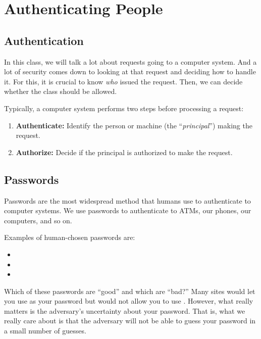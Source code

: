 \chapter{Authenticating People}


\section{Authentication}
In this class, we will talk a lot about requests
going to a computer system.
And a lot of security comes down to looking at that request and deciding
how to handle it.
For this, it is crucial to know
\textit{who} issued the request. Then, we can
decide whether the class should be allowed.

Typically, a computer system performs two steps before processing
a request:
\begin{enumerate}
  \item \textbf{Authenticate:} Identify the person or machine (the ``\emph{principal}'') making the request.
  \item \textbf{Authorize:} Decide if the principal is authorized to make the request.
\end{enumerate}

\section{Passwords}
Passwords are the most widespread method 
that humans use to authenticate to computer systems.
We use passwords to authenticate to ATMs,
our phones, our computers, and so on.

Examples of human-chosen passwords are:
\begin{itemize}
	\item {}
	\item {}
	\item {}
\end{itemize}

Which of these passwords are ``good'' and which
are ``bad?''
Many sites would let you use
 as your password but would not allow
you to use .
However, what really matters is the adversary's
uncertainty about your password.
That is, what we really care about is that the adversary
will not be able to guess your password in
a small number of guesses.


